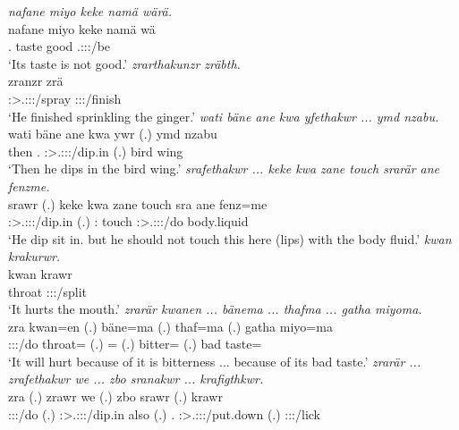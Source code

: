 \begin{exe}
	\emph{nafane miyo keke namä wärä.}\\
	\gll nafane miyo keke namä wä\\
	\Tsg.{\Poss} taste {\Neg} good \Tsg.\Masc:\Io:\Nonpast:\Ipfv/be\\
	\trans `Its taste is not good.'
	\emph{zrarthakunzr zräbth.}\\
	\gll zranzr zrä\\
	\Stsg:\Sbj>\Tsg.\F:\Obj:\Irr:\Ipfv/spray \Stsg:\Sbj:\Irr:\Pfv/finish\\
	\trans `He finished sprinkling the ginger.'
	\emph{wati bäne ane kwa yfethakwr ... ymd nzabu.}\\
	\gll wati bäne ane kwa ywr (.) ymd nzabu\\
	then \Recog.{\Abs} {\Dem} {\Fut} \Stsg:\Sbj>\Tsg.\Masc:\Obj:\Nonpast:\Ipfv/dip.in (.) bird wing\\
	\trans `Then he dips in the bird wing.'
	\emph{srafethakwr ... keke kwa zane touch srarär ane fenzme.}\\
	\gll srawr (.) keke kwa zane touch sra ane fenz=me\\
	\Stsg:\Sbj>\Tsg.\Masc:\Obj:\Irr:\Ipfv/dip.in (.) {\Neg} {\Fut} \Dem:{\Prox} touch \Stsg:\Sbj>\Tsg.\Masc:\Io:\Irr:\Ipfv/do {\Dem} body.liquid\\
	\trans `He dip sit in. but he should not touch this here (lips) with the body fluid.'
\newpage 
{}
	\emph{kwan krakurwr.}\\
	\gll kwan krawr\\
	throat \Stsg:\Sbj:\Irr:\Ipfv/split\\
	\trans `It hurts the mouth.'
	\emph{zrarär kwanen ... bänema ... thafma ... gatha miyoma.}\\
	\gll zra kwan=en (.) bäne=ma (.) thaf=ma (.) gatha miyo=ma\\
	\Stsg:\Sbj:\Irr:\Ipfv/do throat={\Loc} (.) \Recog={\Char} (.) bitter={\Char} (.) bad taste=\Char\\
	\trans `It will hurt because of it is bitterness ... because of its bad taste.'
	\emph{zrarär ... zrafethakwr we ... zbo sranakwr ... krafigthkwr.}\\
	\gll zra (.) zrawr we (.) zbo srawr (.) krawr\\
	\Stsg:\Sbj:\Irr:\Ipfv/do (.) \Stsg:\Sbj>\Tsg.\F:\Obj:\Irr:\Ipfv/dip.in also (.) \Prox.{\All} \Stsg:\Sbj>\Tsg.\Masc:\Io:\Irr:\Ipfv/put.down (.) \Stsg:\Sbj:\Irr:\Ipfv/lick\\

\end{exe}
